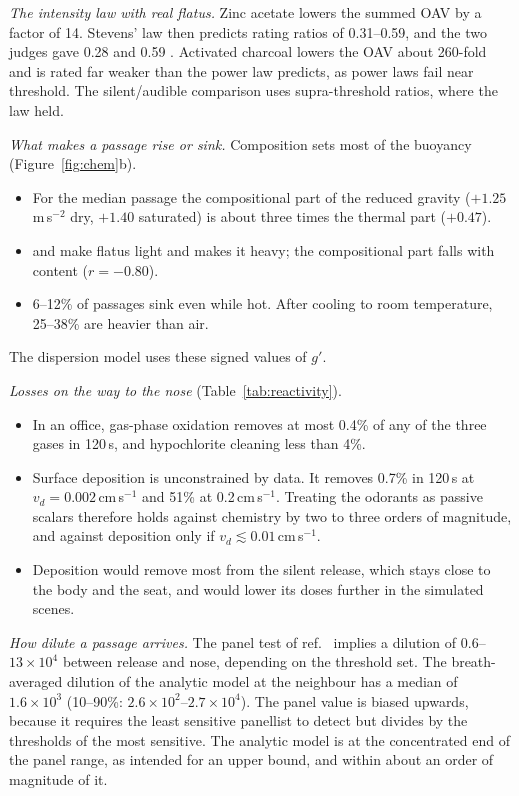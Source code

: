 \documentclass[11pt]{article}
\begin{document}
\emph{The intensity law with real flatus.} Zinc acetate lowers the summed OAV by a factor of 14. Stevens' law then
predicts rating ratios of 0.31--0.59, and the two judges gave 0.28 and 0.59 \cite{suarez1998}. Activated charcoal
lowers the OAV about 260-fold and is rated far weaker than the power law predicts, as power laws fail near threshold.
The silent/audible comparison uses supra-threshold ratios, where the law held.

\emph{What makes a passage rise or sink.} Composition sets most of the buoyancy (Figure~\ref{fig:chem}b).
\begin{itemize}
  \item For the median passage the compositional part of the reduced gravity ($+1.25$\,m\,s$^{-2}$ dry, $+1.40$
  saturated) is about three times the thermal part ($+0.47$).
  \item {} and  make flatus light and  makes it heavy; the compositional part falls with 
  content ($r = -0.80$).
  \item 6--12\% of passages sink even while hot. After cooling to room temperature, 25--38\% are heavier than air.
\end{itemize}
The dispersion model uses these signed values of $g'$.

\emph{Losses on the way to the nose} (Table~\ref{tab:reactivity}).
\begin{itemize}
  \item In an office, gas-phase oxidation removes at most 0.4\% of any of the three gases in 120\,s, and hypochlorite
  cleaning less than 4\%.
  \item Surface deposition is unconstrained by data. It removes 0.7\% in 120\,s at $v_d = 0.002$\,cm\,s$^{-1}$ and 51\%
  at 0.2\,cm\,s$^{-1}$. Treating the odorants as passive scalars therefore holds against chemistry by two to three
  orders of magnitude, and against deposition only if $v_d \lesssim 0.01$\,cm\,s$^{-1}$.
  \item Deposition would remove most from the silent release, which stays close to the body and the seat, and would
  lower its doses further in the simulated scenes.
\end{itemize}

\emph{How dilute a passage arrives.} The panel test of ref.~ implies a dilution of
$0.6$--$13\times10^{4}$ between release and nose, depending on the threshold set. The breath-averaged dilution of the
analytic model at the neighbour has a median of $1.6\times10^{3}$ (10--90\%: $2.6\times10^{2}$--$2.7\times10^{4}$).
The panel value is biased upwards, because it requires the least sensitive panellist to detect but divides by the
thresholds of the most sensitive. The analytic model is at the concentrated end of the panel range, as intended for
an upper bound, and within about an order of magnitude of it.
\end{document}

